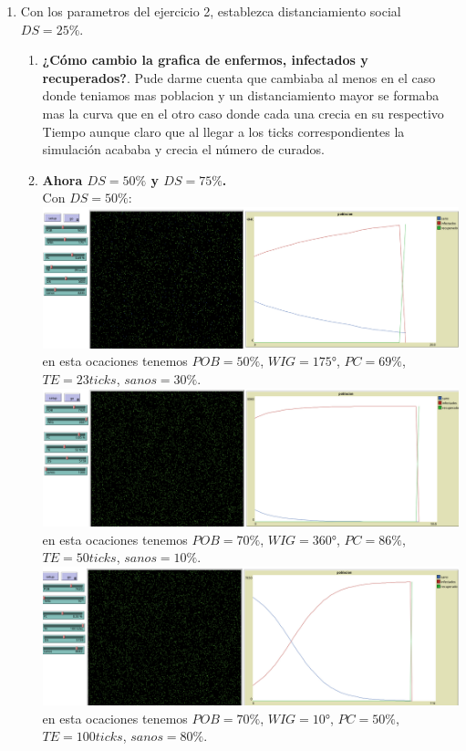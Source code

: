 \documentclass[12pt]{article}
\begin{document}
\begin{enumerate}
    \item Con los parametros del ejercicio 2, establezca distanciamiento social $DS=25\%$.
    \begin{enumerate}
        \item \textbf{¿Cómo cambio la grafica de enfermos, infectados y recuperados?}.
        Pude darme cuenta que cambiaba al menos en el caso donde teniamos mas poblacion y un distanciamiento mayor se formaba mas la curva que en el otro caso donde cada una crecia en su respectivo Tiempo
        aunque claro que al llegar a los ticks correspondientes la simulación acababa y  crecia el número de curados.
        \item \textbf{Ahora $DS=50\%$ y $DS=75\%$.}\\
        Con $DS=50\%$:\\
        
        \textbf{\includegraphics[scale = 0.30]{images/30-50.png}}\\
        en esta ocaciones tenemos $POB=50\%$, $WIG=175$°, $PC=69\%$, $TE=23ticks$, $sanos=30\%$.\\
        
        \textbf{\includegraphics[scale = 0.30]{images/31-50-50.png}}\\
        en esta ocaciones tenemos $POB=70\%$, $WIG=360$°, $PC=86\%$, $TE=50ticks$, $sanos=10\%$.\\
    

        \textbf{\includegraphics[scale = 0.30]{images/32-50.png}}\\
        en esta ocaciones tenemos $POB=70\%$, $WIG=10$°, $PC=50\%$, $TE=100ticks$, $sanos=80\%$.\\


\end{enumerate}
\end{enumerate}
\end{document}
